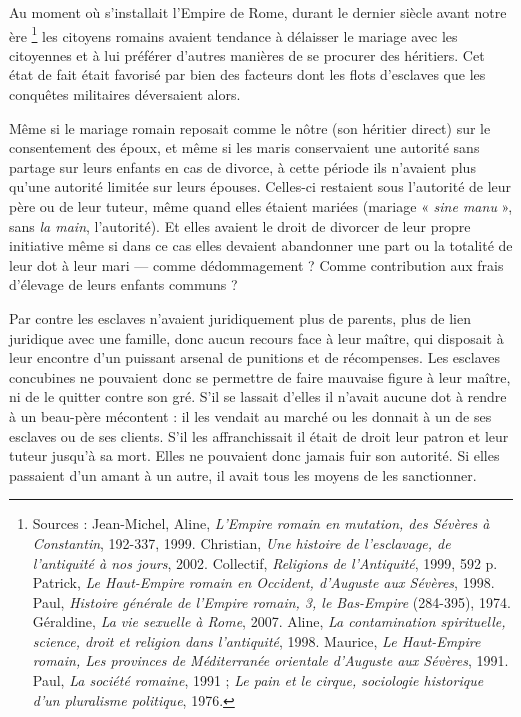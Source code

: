  Au moment où s'installait l'Empire de Rome, durant le dernier siècle avant notre ère%
\footnote{Sources :  Jean-Michel,  Aline, \emph{L'Empire romain en mutation, des Sévères à Constantin}, 192-337, 1999.  Christian, \emph{Une histoire de l'esclavage, de l'antiquité à nos jours}, 2002. Collectif, \emph{Religions de l'Antiquité}, 1999, 592 p.  Patrick, \emph{Le Haut-Empire romain en Occident, d'Auguste aux Sévères}, 1998.  Paul, \emph{Histoire générale de l'Empire romain, 3, le Bas-Empire} (284-395), 1974.  Géraldine, \emph{La vie sexuelle à Rome}, 2007.  Aline, \emph{La contamination spirituelle, science, droit et religion dans l'antiquité}, 1998.  Maurice, \emph{Le Haut-Empire romain, Les provinces de Méditerranée orientale d'Auguste aux Sévères}, 1991.  Paul, \emph{La société romaine}, 1991 ; \emph{Le pain et le cirque, sociologie historique d'un pluralisme politique}, 1976.}
les citoyens romains avaient tendance à délaisser le mariage avec les citoyennes et à lui préférer d'autres manières de se procurer des héritiers. Cet état de fait était favorisé par bien des facteurs dont les flots d'esclaves que les conquêtes militaires déversaient alors. 

 Même si le mariage romain reposait comme le nôtre (son héritier direct) sur le consentement des époux, et même si les maris conservaient une autorité sans partage sur leurs enfants en cas de divorce, à cette période ils n'avaient plus qu'une autorité limitée sur leurs épouses. Celles-ci restaient sous l'autorité de leur père ou de leur tuteur, même quand elles étaient mariées (mariage « \emph{sine manu} », sans \emph{la main}, l'autorité). Et elles avaient le droit de divorcer de leur propre initiative même si dans ce cas elles devaient abandonner une part ou la totalité de leur dot à leur mari --- comme dédommagement ? Comme contribution aux frais d'élevage de leurs enfants communs ?

 Par contre les esclaves n'avaient juridiquement plus de parents, plus de lien juridique avec une famille, donc aucun recours face à leur maître, qui disposait à leur encontre d'un puissant arsenal de punitions et de récompenses. Les esclaves concubines ne pouvaient donc se permettre de faire mauvaise figure à leur maître, ni de le quitter contre son gré. S'il se lassait d'elles il n'avait aucune dot à rendre à un beau-père mécontent : il les vendait au marché ou les donnait à un de ses esclaves ou de ses clients. S'il les affranchissait il était de droit leur patron et leur tuteur jusqu'à sa mort. Elles ne pouvaient donc jamais fuir son autorité. Si elles passaient d'un amant à un autre, il avait tous les moyens de les sanctionner.

